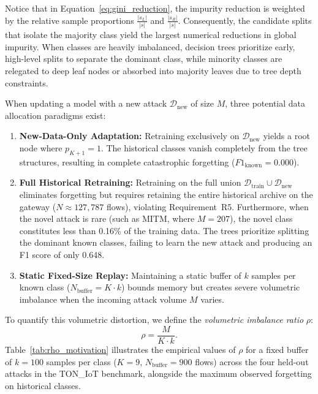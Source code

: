 Notice that in Equation~\eqref{eq:gini_reduction}, the impurity reduction is weighted by the relative sample proportions $\frac{|s_L|}{|s|}$ and $\frac{|s_R|}{|s|}$. Consequently, the candidate splits that isolate the majority class yield the largest numerical reductions in global impurity. When classes are heavily imbalanced, decision trees prioritize early, high-level splits to separate the dominant class, while minority classes are relegated to deep leaf nodes or absorbed into majority leaves due to tree depth constraints.

When updating a model with a new attack $\mathcal{D}_{\text{new}}$ of size $M$, three potential data allocation paradigms exist:
\begin{enumerate}
    \item \textbf{New-Data-Only Adaptation:} Retraining exclusively on $\mathcal{D}_{\text{new}}$ yields a root node where $p_{K+1} = 1$. The historical classes vanish completely from the tree structures, resulting in complete catastrophic forgetting ($F1_{\text{known}} = 0.000$).
    \item \textbf{Full Historical Retraining:} Retraining on the full union $\mathcal{D}_{\text{train}} \cup \mathcal{D}_{\text{new}}$ eliminates forgetting but requires retaining the entire historical archive on the gateway ($N \approx 127{,}787$ flows), violating Requirement~R5. Furthermore, when the novel attack is rare (such as MITM, where $M = 207$), the novel class constitutes less than 0.16\% of the training data. The trees prioritize splitting the dominant known classes, failing to learn the new attack and producing an F1 score of only 0.648.
    \item \textbf{Static Fixed-Size Replay:} Maintaining a static buffer of $k$ samples per known class ($N_{\text{buffer}} = K \cdot k$) bounds memory but creates severe volumetric imbalance when the incoming attack volume $M$ varies.
\end{enumerate}

To quantify this volumetric distortion, we define the \textit{volumetric imbalance ratio} $\rho$:
\begin{equation}
\rho = \frac{M}{K \cdot k}.
\label{eq:volumetric_imbalance_ratio}
\end{equation}
Table~\ref{tab:rho_motivation} illustrates the empirical values of $\rho$ for a fixed buffer of $k = 100$ samples per class ($K = 9$, $N_{\text{buffer}} = 900$ flows) across the four held-out attacks in the TON\_IoT benchmark, alongside the maximum observed forgetting on historical classes.

